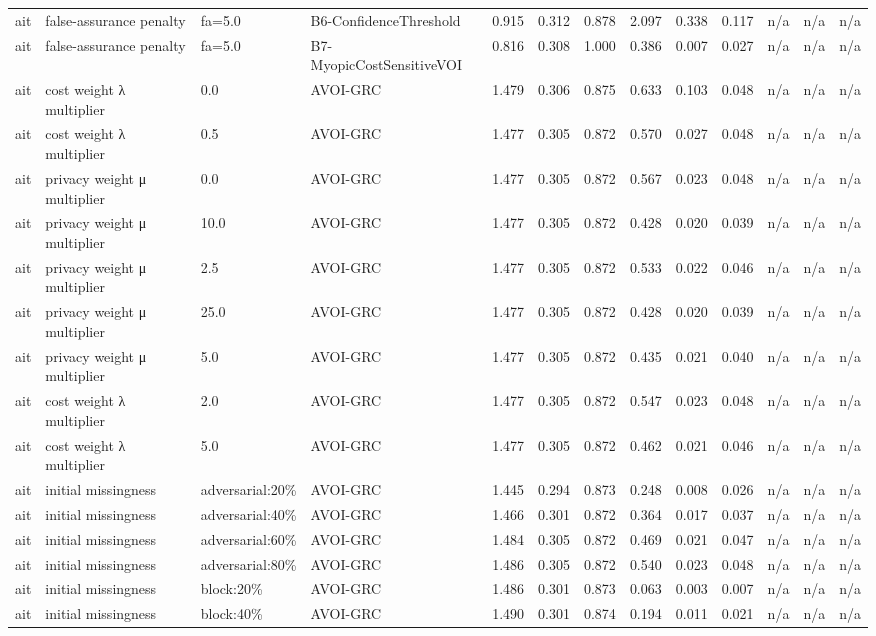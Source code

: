 \begin{table}[!ht]
{\begin{tabular}{lllllllllllll}
ait & false-assurance penalty & fa=5.0 & B6-ConfidenceThreshold & 0.915 & 0.312 & 0.878 & 2.097 & 0.338 & 0.117 & n/a & n/a & n/a \\
ait & false-assurance penalty & fa=5.0 & B7-MyopicCostSensitiveVOI & 0.816 & 0.308 & 1.000 & 0.386 & 0.007 & 0.027 & n/a & n/a & n/a \\
ait & cost weight λ multiplier & 0.0 & AVOI-GRC & 1.479 & 0.306 & 0.875 & 0.633 & 0.103 & 0.048 & n/a & n/a & n/a \\
ait & cost weight λ multiplier & 0.5 & AVOI-GRC & 1.477 & 0.305 & 0.872 & 0.570 & 0.027 & 0.048 & n/a & n/a & n/a \\
ait & privacy weight μ multiplier & 0.0 & AVOI-GRC & 1.477 & 0.305 & 0.872 & 0.567 & 0.023 & 0.048 & n/a & n/a & n/a \\
ait & privacy weight μ multiplier & 10.0 & AVOI-GRC & 1.477 & 0.305 & 0.872 & 0.428 & 0.020 & 0.039 & n/a & n/a & n/a \\
ait & privacy weight μ multiplier & 2.5 & AVOI-GRC & 1.477 & 0.305 & 0.872 & 0.533 & 0.022 & 0.046 & n/a & n/a & n/a \\
ait & privacy weight μ multiplier & 25.0 & AVOI-GRC & 1.477 & 0.305 & 0.872 & 0.428 & 0.020 & 0.039 & n/a & n/a & n/a \\
ait & privacy weight μ multiplier & 5.0 & AVOI-GRC & 1.477 & 0.305 & 0.872 & 0.435 & 0.021 & 0.040 & n/a & n/a & n/a \\
ait & cost weight λ multiplier & 2.0 & AVOI-GRC & 1.477 & 0.305 & 0.872 & 0.547 & 0.023 & 0.048 & n/a & n/a & n/a \\
ait & cost weight λ multiplier & 5.0 & AVOI-GRC & 1.477 & 0.305 & 0.872 & 0.462 & 0.021 & 0.046 & n/a & n/a & n/a \\
ait & initial missingness & adversarial:20\% & AVOI-GRC & 1.445 & 0.294 & 0.873 & 0.248 & 0.008 & 0.026 & n/a & n/a & n/a \\
ait & initial missingness & adversarial:40\% & AVOI-GRC & 1.466 & 0.301 & 0.872 & 0.364 & 0.017 & 0.037 & n/a & n/a & n/a \\
ait & initial missingness & adversarial:60\% & AVOI-GRC & 1.484 & 0.305 & 0.872 & 0.469 & 0.021 & 0.047 & n/a & n/a & n/a \\
ait & initial missingness & adversarial:80\% & AVOI-GRC & 1.486 & 0.305 & 0.872 & 0.540 & 0.023 & 0.048 & n/a & n/a & n/a \\
ait & initial missingness & block:20\% & AVOI-GRC & 1.486 & 0.301 & 0.873 & 0.063 & 0.003 & 0.007 & n/a & n/a & n/a \\
ait & initial missingness & block:40\% & AVOI-GRC & 1.490 & 0.301 & 0.874 & 0.194 & 0.011 & 0.021 & n/a & n/a & n/a \\

\end{tabular}}
\end{table}
